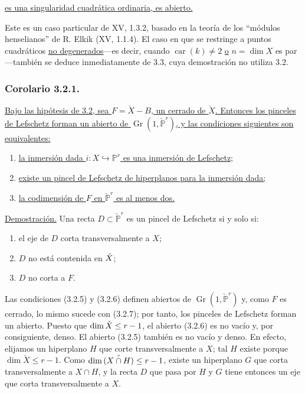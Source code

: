 \pageoriginale

\underline{es una singularidad cuadrática ordinaria, es abierto.}

Este es un caso particular de XV, 1.3.2, basado en la teoría de los
``módulos henselianos'' de R. Elkik (XV, 1.1.4). El caso en que se
restringe a puntos cuadráticos \underline{no degenerados}---es decir,
cuando $\operatorname{car}(k)\ne2$ \underline{o}
$n=\dim X$ es par---también se deduce inmediatamente de 3.3, cuya
demostración no utiliza 3.2.

\subsubsection*{Corolario 3.2.1.}
\underline{Bajo las hipótesis de 3.2, sea $F=\check X-B$, un cerrado
de $\check X$. Entonces los pinceles de Lefschetz forman un abierto de
$\operatorname{Gr}(1,\check{\mathbb P}^{r})$, y las condiciones
siguientes son equivalentes:}
\begin{enumerate}
\item[3.2.2.] \underline{la inmersión dada
$i:X\hookrightarrow\mathbb P^r$ es una inmersión de Lefschetz;}
\item[3.2.3.] \underline{existe un pincel de Lefschetz de hiperplanos
para la inmersión dada;}
\item[3.2.4.] \underline{la codimensión de $F$ en
$\check{\mathbb P}^{r}$ es al menos dos.}
\end{enumerate}

\noindent\underline{Demostración.}
Una recta $D\subset\check{\mathbb P}^{r}$ es un pincel de Lefschetz si
y solo si:
\begin{enumerate}
\item[(3.2.5)] el eje de $D$ corta transversalmente a $X$;
\item[(3.2.6)] $D$ no está contenida en
$\sisi{X}{\check X}$;
\item[(3.2.7)] $D$ no corta a $F$.
\end{enumerate}

\pageoriginale

Las condiciones (3.2.5) y (3.2.6) definen abiertos de
$\operatorname{Gr}(1,\check{\mathbb P}^{r})$ y, como $F$ es cerrado,
lo mismo sucede con (3.2.7); por tanto, los pinceles de Lefschetz
forman un abierto. Puesto que $\dim\sisi{X}{\check X}\leq r-1$, el abierto (3.2.6) es
no vacío y, por consiguiente, denso. El abierto (3.2.5) también es no
vacío y denso. En efecto, elijamos un hiperplano $H$ que corte
transversalmente a $X$; tal $H$ existe porque $\dim\check X\leq r-1$.
Como $\dim\check{(X\cap \sisi{G}{H})}\leq r-1$, existe un hiperplano $G$ que corta
transversalmente a $X\cap H$, y la recta $D$ que pasa por $H$ y $G$
tiene entonces un eje que corta transversalmente a $X$.

